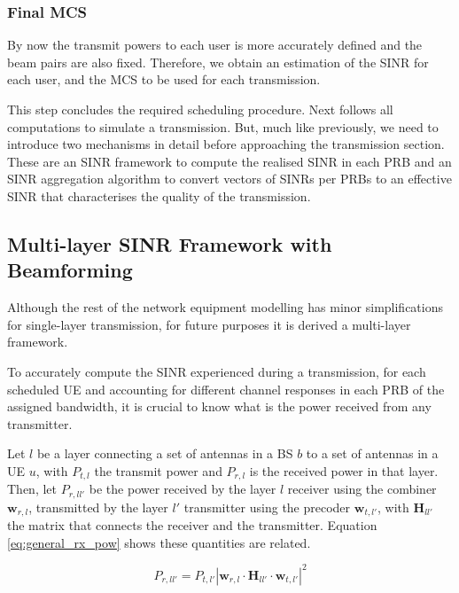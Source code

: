 \subsubsection*{Final MCS}

By now the transmit powers to each user is more accurately defined and the beam pairs are also fixed. Therefore, we obtain an estimation of the SINR for each user, and the MCS to be used for each transmission.

This step concludes the required scheduling procedure. Next follows all computations to simulate a transmission. But, much like previously, we need to introduce two mechanisms in detail before approaching the transmission section. These are an SINR framework to compute the realised SINR in each PRB and an SINR aggregation algorithm to convert vectors of SINRs per PRBs to an effective SINR that characterises the quality of the transmission.


\subsection*{Multi-layer SINR Framework with Beamforming}
\label{sec:sinr_framework}

Although the rest of the network equipment modelling has minor simplifications for single-layer transmission, for future purposes it is derived a multi-layer framework. 

To accurately compute the SINR experienced during a transmission, for each scheduled \acs{UE} and accounting for different channel responses in each \acs{PRB} of the assigned bandwidth, it is crucial to know what is the power received from any transmitter.


Let $l$ be a layer connecting a set of antennas in a BS $b$ to a set of antennas in a UE $u$, with $P_{t, l}$ the transmit power and $P_{r, l}$ is the received power in that layer. Then, let $P_{r, ll'}$ be the power received by the layer $l$ receiver using the combiner $\bm{w}_{r, l}$, transmitted by the layer $l'$ transmitter using the precoder $\bm{w}_{t, l'}$, with $\bm{H}_{ll'}$ the matrix that connects the receiver and the transmitter. Equation \eqref{eq:general_rx_pow} shows these quantities are related.

\begin{equation} \label{eq:general_rx_pow}
    P_{r, ll'} = P_{t, l'} \left| \bm{w}_{r, l} \cdot \bm{H}_{ll'} \cdot \bm{w}_{t, l'} \right|^2        
\end{equation}

